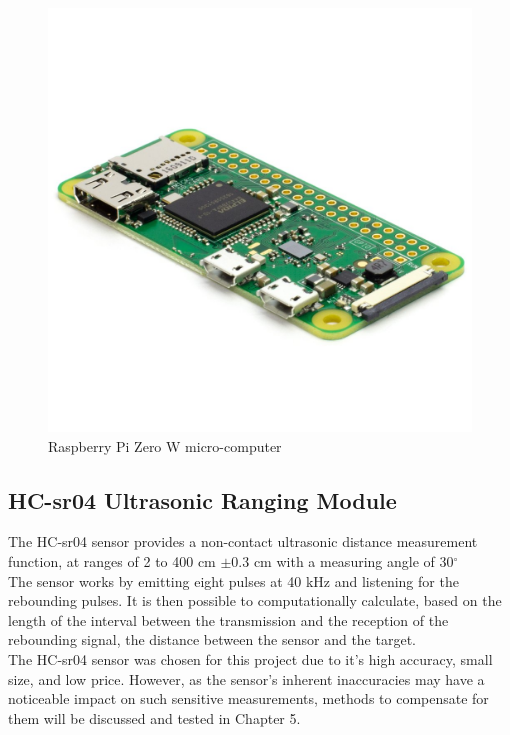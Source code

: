 \documentclass[twoside]{ctuthesis}
\theoremstyle{plain}
\theoremstyle{definition}
\theoremstyle{note}
\begin{document}
\begin{figure}[H]
	\centering
	\includegraphics[scale=0.15]{RasPIZeroW}
	\caption{Raspberry Pi Zero W micro-computer \cite{RasPi0W}}
\end{figure}


\subsection{HC-sr04 Ultrasonic Ranging Module}
The HC-sr04 sensor provides a non-contact ultrasonic distance measurement function, at ranges of 2 to 400 cm $\pm$0.3 cm with a measuring angle of 30$^\circ$\\
The sensor works by emitting eight pulses at 40 kHz and listening for the rebounding pulses. It is then possible to computationally calculate, based on the length of the interval between the transmission and the reception of the rebounding signal, the distance between the sensor and the target.\\
The HC-sr04 sensor was chosen for this project due to it's high accuracy, small size, and low price. However, as the sensor's inherent inaccuracies may have a noticeable impact on such sensitive measurements, methods to compensate for them will be discussed and tested in Chapter 5.\\
\end{document}
